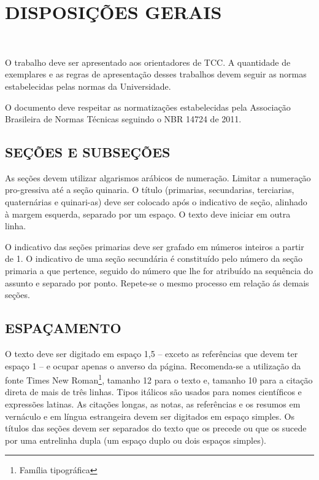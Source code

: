 %
%

\chapter{DISPOSIÇÕES GERAIS}

\


O trabalho deve ser apresentado aos orientadores de TCC. A quantidade de exemplares e as regras de apresentação desses trabalhos devem seguir as normas estabelecidas pelas normas da Universidade.

O documento deve respeitar as normatizações estabelecidas pela Associação Brasileira de Normas Técnicas seguindo o NBR 14724 de 2011.

\section{SEÇÕES E SUBSEÇÕES}

As seções devem utilizar algarismos arábicos de numeração. Limitar a numeração pro-gressiva até a seção quinaria. O título (primarias, secundarias, terciarias, quaternárias e quinari-as) deve ser colocado após o indicativo de seção, alinhado à margem esquerda, separado por um espaço. O texto deve iniciar em outra linha. 

O indicativo das seções primarias deve ser grafado em números inteiros a partir de 1. O indicativo de uma seção secundária é constituído pelo número da seção primaria a que pertence, seguido do número que lhe for atribuído na sequência do assunto e separado por ponto. Repete-se o mesmo processo em relação ás demais seções.

\section{ESPAÇAMENTO}

O texto deve ser digitado em espaço 1,5 – exceto as referências que devem ter espaço 1 – e ocupar apenas o anverso da página. Recomenda-se a utilização da fonte Times New Roman\footnote{Família tipográfica}, tamanho 12 para o texto e, tamanho 10 para a citação direta de mais de três linhas. Tipos itálicos são usados para nomes científicos e expressões latinas. As citações longas, as notas, as referências e os resumos em vernáculo e em língua estrangeira devem ser digitados em espaço simples. Os títulos das seções devem ser separados do texto que os precede ou que os sucede por uma entrelinha dupla (um espaço duplo ou dois espaços simples).

